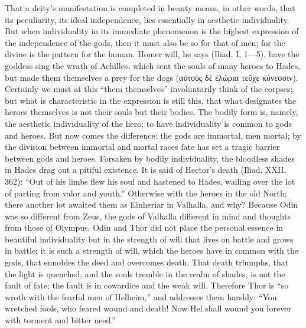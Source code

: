 \documentclass[12pt]{book}
\newcommand{\opage}[1]{\marginnote{\footnotesize\textit{[#1]}}}
\begin{document}
That a deity's manifestation is completed in beauty means, in other
words, that its peculiarity, its ideal independence, lies essentially in
aesthetic individuality. But when individuality in its immediate
phenomenon is the highest expression of the independence of the gods,
then it must also be so for that of men; for the divine is the pattern
for the human. Homer will, he says (Iliad. I, 1---5), have the goddess
sing the wrath of Achilles, which sent the souls of many heroes to
Hades, but made them themselves a prey for the dogs
(αὐτοὺς δὲ ἑλώρια τεῦχε κύνεσσιν). Certainly we must at this ``them
themselves'' involuntarily think of the corpses; but what is
characteristic in the expression is still this, that what designates
the heroes themselves is not their souls but their bodies. The bodily
form is, namely, the aesthetic individuality of the hero; to have
individuality is common to gods and heroes. But now comes the
difference: the gods are immortal, men mortal; by the division between
immortal and mortal races fate has set a tragic barrier between gods and
heroes. Forsaken by bodily individuality, the bloodless shades in Hades
drag out a pitiful existence. It is said of Hector's death (Iliad. XXII,
362): ``Out of his limbs flew his
\opage{23}\setcounter{footnote}{0}%
soul and hastened to Hades, wailing over the lot of parting from valor
and youth.'' Otherwise with the heroes in the old North; there another
lot awaited them as Einheriar in Valhalla, and why? Because Odin was so
different from Zeus, the gods of Valhalla different in mind and thoughts
from those of Olympus. Odin and Thor did not place the personal essence
in beautiful individuality but in the strength of will that lives on
battle and grows in battle; it is such a strength of will, which the
heroes have in common with the gods, that ennobles the deed and
overcomes death. That death triumphs, that the light is quenched, and
the souls tremble in the realm of shades, is not the fault of fate; the
fault is in cowardice and the weak will. Therefore Thor is ``so wroth
with the fearful men of Helheim,'' and addresses them harshly: ``You
wretched fools, who feared wound and death! Now Hel shall wound you
forever with torment and bitter need.''
\end{document}
